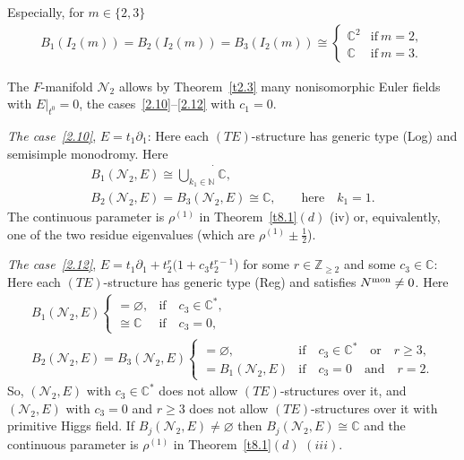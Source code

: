 \documentclass[10pt,a4paper]{amsart}
\numberwithin{equation}{section}
\numberwithin{figure}{section}
\newcommand{\N}{{\mathbb N}}
\newcommand{\Z}{{\mathbb Z}}
\newcommand{\C}{{\mathbb C}}
\newcommand{\NN}{{\mathcal N}}
\newcommand{\paa}{\partial}
\begin{document}
\begin{Remarks}
\begin{enumerate}
Especially, for $m\in\{2,3\}$
\begin{gather*}%
B_1(I_2(m))=B_2(I_2(m))=B_3(I_2(m))\cong
\begin{cases} \C^2&\text{if}\ m=2,\\
\C&\text{if}\ m=3.\end{cases}
\end{gather*}

The $F$-manifold $\NN_2$ allows by Theorem~\ref{t2.3}
many nonisomorphic Euler fields with $E|_{t^0}=0$, the
cases~\eqref{2.10}--\eqref{2.12} with $c_1=0$.

{\it The case~\eqref{2.10}}, $E=t_1\paa_1$:
Here each $(TE)$-structure has generic type (Log)
and semisimple monodromy. Here
\begin{gather*}%
B_1(\NN_2,E)\cong \dot{\bigcup\limits_{k_1\in\N}}\C,
\\
B_2(\NN_2,E)= B_3(\NN_2,E) \cong \C,\qquad
\text{here}\quad k_1=1.\nonumber
\end{gather*}
The continuous parameter is $\rho^{(1)}$ in Theorem~\ref{t8.1}$(d)$ (iv) or, equivalently, one of the
two residue eigenvalues \big(which are $\rho^{(1)}\pm\frac{1}{2}$\big).


{\it The case~\eqref{2.12}},
$E=t_1\paa_1+t_2^r\big(1+c_3t_2^{r-1}\big)$
for some $r\in\Z_{\geq 2}$ and some $c_3\in\C$:
Here each $(TE)$-structure has generic type (Reg) and
satisfies $N^{\rm mon}\neq 0$. Here
\begin{gather*}%
B_1(\NN_2,E) \begin{cases}
=\varnothing,& \text{if}\quad c_3\in\C^*,\\
\cong \C&\text{if}\quad c_3=0,\end{cases}
\\
B_2(\NN_2,E)=B_3(\NN_2,E) \begin{cases}
=\varnothing,& \text{if}\quad c_3\in\C^*\quad \text{or}\quad r\geq 3,\\
=B_1(\NN_2,E)&\text{if}\quad c_3=0\quad \text{and}\quad r=2.
\end{cases}
\end{gather*}
So, $(\NN_2,E)$ with $c_3\in\C^*$ does not allow
$(TE)$-structures over it, and $(\NN_2,E)$ with
$c_3=0$ and $r\geq 3$ does not allow $(TE)$-structures
over it with primitive Higgs field.
If $B_j(\NN_2,E)\allowbreak\neq\varnothing$ then $B_j(\NN_2,E)\cong\C$
and the continuous parameter is $\rho^{(1)}$ in
Theorem~\ref{t8.1}$(d)$ $(iii)$.


\end{enumerate}
\end{Remarks}
\end{document}
